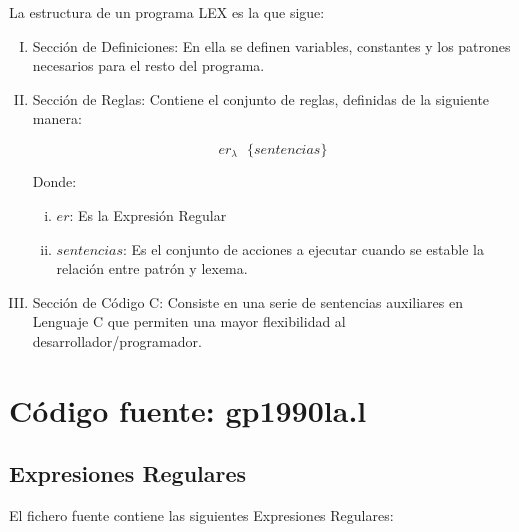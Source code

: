 La estructura de un programa LEX es la que sigue:



\begin{enumerate}[I.]

\item Sección de Definiciones: En ella se definen variables, constantes y los patrones necesarios para el resto del programa.

\item Sección de Reglas: Contiene el conjunto de reglas, definidas de la siguiente manera:

\begin{equation}
er_\lambda\ \ \ \{sentencias\}
\end{equation}

Donde:

\begin{enumerate}[i.]

\item $er$: Es la Expresión Regular

\item $sentencias$: Es el conjunto de acciones a ejecutar cuando se estable la relación entre patrón y lexema.

\end{enumerate}

\item Sección de Código C: Consiste en una serie de sentencias auxiliares en Lenguaje C que permiten una mayor flexibilidad al desarrollador/programador.

\end{enumerate}

\section{Código fuente: gp1990la.l}

\subsection{Expresiones Regulares}

El fichero fuente contiene las siguientes Expresiones Regulares:

